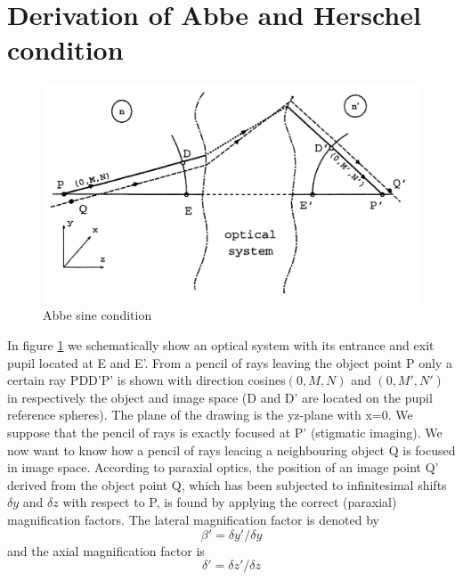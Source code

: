 \documentclass[../main.tex]{subfiles}
\begin{document}
	\section{Derivation of Abbe and Herschel condition}
	\begin{figure}[h!]
	  \centering
	  \includegraphics[scale=0.7]{../graphics/Abbe_sine_condition1.png}
	  \caption{Abbe sine condition}
	  \label{fig:abbe}
	\end{figure}
	In figure \ref{fig:abbe} we schematically show an optical system with its entrance and exit pupil located at E and E'. From a pencil of rays leaving the object point P only a certain ray PDD'P' is shown with direction cosines$(0,M,N)$ and $(0,M',N')$ in respectively the object and image space (D and D' are located on the pupil reference spheres). The plane of the drawing is the yz-plane with x=0. We suppose that the pencil of rays is exactly focused at P' (stigmatic imaging). We now want to know how a pencil of rays leacing a neighbouring object Q is focused in image space. According to paraxial optics, the position of an image point Q' derived from the object point Q, which has been subjected to infinitesimal shifts $\delta y$ and $\delta z$ with respect to P, is found by applying the correct (paraxial) magnification factors. The lateral magnification factor is denoted by 
	\begin{equation}
	\beta'=\delta y'/\delta y
	\end{equation}
	and the axial magnification factor is 
	\begin{equation}
	\delta'=\delta z'/\delta z
	\end{equation}
\end{document}
